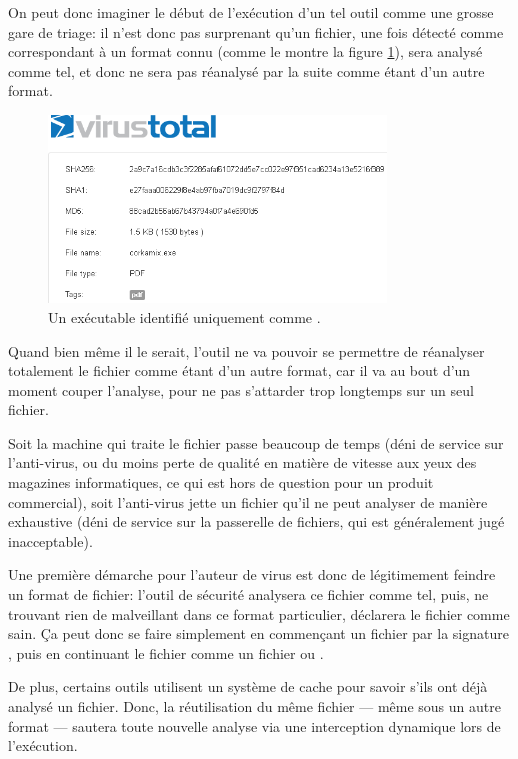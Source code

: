 On peut donc imaginer le début de l'exécution d'un tel outil comme une grosse gare de triage: il n'est donc pas surprenant qu'un fichier, une fois détecté comme correspondant à un format connu (comme le montre la figure \ref{fig:albertini:corkamix-vt}), sera analysé comme tel, et donc ne sera pas réanalysé par la suite comme étant d'un autre format.

\begin{figure}[ht]
  \centering
  \includegraphics[width=0.8\textwidth]{albertini/img/corkamix-vt}
  \caption{Un exécutable identifié uniquement comme \PDF.}
  \label{fig:albertini:corkamix-vt}
\end{figure}

Quand bien même il le serait, l'outil ne va pouvoir se permettre de réanalyser totalement le fichier comme étant d'un autre format, car il va au bout d'un moment couper l'analyse, pour ne pas s'attarder trop longtemps sur un seul fichier.

Soit la machine qui traite le fichier passe beaucoup de temps (déni de service sur l'anti-virus, ou du moins perte de qualité en matière de vitesse aux yeux des magazines informatiques, ce qui est hors de question pour un produit commercial),
soit l'anti-virus jette un fichier qu'il ne peut analyser de manière exhaustive (déni de service sur la passerelle de fichiers, qui est généralement jugé inacceptable).

Une première démarche pour l'auteur de virus est donc de légitimement feindre un format de fichier: l'outil de sécurité analysera ce fichier comme tel, puis, ne trouvant rien de malveillant dans ce format particulier, déclarera le fichier comme sain.
Ça peut donc se faire simplement en commençant un fichier par la signature \PE,
puis en continuant le fichier comme un fichier \HTML ou \PDF.

De plus, certains outils utilisent un système de cache pour savoir s'ils ont déjà analysé un fichier. Donc, la réutilisation du même fichier --- même sous un autre format --- sautera toute nouvelle analyse via une interception dynamique lors de l'exécution.

